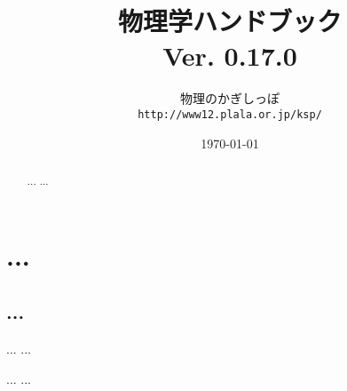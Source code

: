 \documentclass[a4j,10pt,oneside,openany]{jsbook}
\title{{\Huge \textbf{物理学ハンドブック}}\\ {\small Ver. 0.17.0}}
\author{物理のかぎしっぽ\\ \texttt{http://www12.plala.or.jp/ksp/}}
\date{\today}
\begin{document}
%
%
\maketitle
\frontmatter
\tableofcontents
%
%
\mainmatter

\chapter{...}
\begin{abstract}
...
...
\end{abstract}

\section{...}
...
...

\begin{thebibliography}{20}
 ...
 ...
\end{thebibliography}

\newpage
\printindex
%
%
\end{document}
